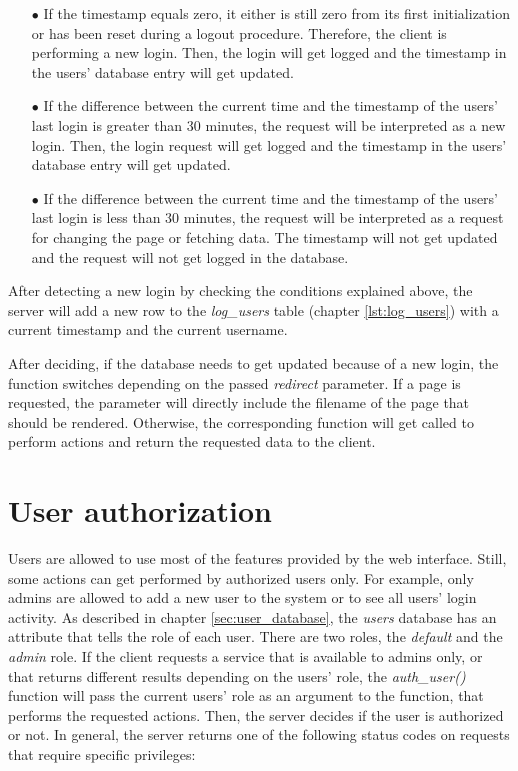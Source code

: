 \begin{itemize}
  \item[$\bullet$] If the timestamp equals zero, it either is still zero from its first initialization or has been reset during a logout procedure. Therefore, the client is performing a new login. Then, the login will get logged and the timestamp in the users' database entry will get updated.
  \item[$\bullet$] If the difference between the current time and the timestamp of the users' last login is greater than 30 minutes, the request will be interpreted as a new login.  Then, the login request will get logged and the timestamp in the users' database entry will get updated.
  \item[$\bullet$]  If the difference between the current time and the timestamp of the users' last login is less than 30 minutes, the request will be interpreted as a request for changing the page or fetching data. The timestamp will not get updated and the request will not get logged in the database.
\end{itemize}

After detecting a new login by checking the conditions explained above, the server will add a new row to the \textit{log\_users} table (chapter \ref{lst:log_users}) with a current timestamp and the current username.

After deciding, if the database needs to get updated because of a new login, the function switches depending on the passed \textit{redirect} parameter. If a page is requested, the parameter will directly include the filename of the page that should be rendered. Otherwise, the corresponding function will get called to perform actions and return the requested data to the client.


\section{User authorization}
\label{sec:user_authorization}
Users are allowed to use most of the features provided by the web interface. Still, some actions can get performed by authorized users only.  For example, only admins are allowed to add a new user to the system or to see all users' login activity. As described in chapter \ref{sec:user_database}, the \textit{users} database has an attribute that tells the role of each user. There are two roles, the \textit{default} and the \textit{admin} role.
If the client requests a service that is available to admins only, or that returns different results depending on the users' role, the \textit{auth\_user()} function will pass the current users' role as an argument to the function, that performs the requested actions. Then, the server decides if the user is authorized or not. In general, the server returns one of the following status codes on requests that require specific privileges:

